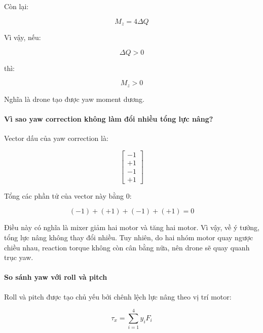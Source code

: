 Còn lại:

\begin{equation}
    M_z = 4\Delta Q
\end{equation}

Vì vậy, nếu:

\begin{equation}
    \Delta Q > 0
\end{equation}

thì:

\begin{equation}
    M_z > 0
\end{equation}

Nghĩa là drone tạo được yaw moment dương.

\paragraph{Vì sao yaw correction không làm đổi nhiều tổng lực nâng?}

Vector dấu của yaw correction là:

\begin{equation}
    \begin{bmatrix}
        -1\\
        +1\\
        -1\\
        +1
    \end{bmatrix}
\end{equation}

Tổng các phần tử của vector này bằng $0$:

\begin{equation}
    (-1)+(+1)+(-1)+(+1)=0
\end{equation}

Điều này có nghĩa là mixer giảm hai motor và tăng hai motor. Vì vậy, về ý
tưởng, tổng lực nâng không thay đổi nhiều. Tuy nhiên, do hai nhóm motor quay
ngược chiều nhau, reaction torque không còn cân bằng nữa, nên drone sẽ quay
quanh trục yaw.

\paragraph{So sánh yaw với roll và pitch}

Roll và pitch được tạo chủ yếu bởi chênh lệch lực nâng theo vị trí motor:

\begin{equation}
    \tau_x = \sum_{i=1}^{4} y_iF_i
\end{equation}

